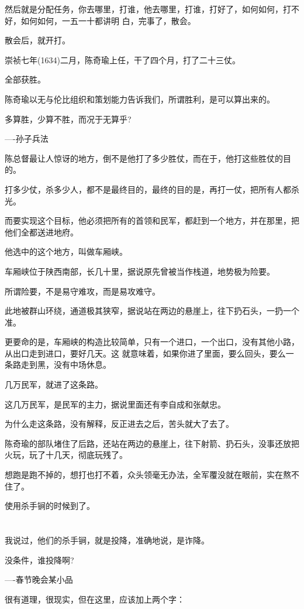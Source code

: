 \documentclass[11pt,a4paper,onecolumn]{article}
\begin{document}
然后就是分配任务，你去哪里，打谁，他去哪里，打谁，打好了，如何如何，打不好，如何如何，一五一十都讲明
白，完事了，散会。

散会后，就开打。

崇祯七年(1634)二月，陈奇瑜上任，干了四个月，打了二十三仗。

全部获胜。

陈奇瑜以无与伦比组织和策划能力告诉我们，所谓胜利，是可以算出来的。

多算胜，少算不胜，而况于无算乎?

----孙子兵法

陈总督最让人惊讶的地方，倒不是他打了多少胜仗，而在于，他打这些胜仗的目的。

打多少仗，杀多少人，都不是最终目的，最终的目的是，再打一仗，把所有人都杀光。

而要实现这个目标，他必须把所有的首领和民军，都赶到一个地方，并在那里，把他们全都送进地府。

他选中的这个地方，叫做车厢峡。

车厢峡位于陕西南部，长几十里，据说原先曾被当作栈道，地势极为险要。

所谓险要，不是易守难攻，而是易攻难守。

此地被群山环绕，通道极其狭窄，据说站在两边的悬崖上，往下扔石头，一扔一个准。

更要命的是，车厢峡的构造比较简单，只有一个进口，一个出口，没有其他小路，从出口走到进口，要好几天。这
就意味着，如果你进了里面，要么回头，要么一条路走到黑，没有中场休息。

几万民军，就进了这条路。

这几万民军，是民军的主力，据说里面还有李自成和张献忠。

为什么走这条路，没有解释，反正进去之后，苦头就大了去了。

陈奇瑜的部队堵住了后路，还站在两边的悬崖上，往下射箭、扔石头，没事还放把火玩，玩了十几天，彻底玩残了。

想跑是跑不掉的，想打也打不着，众头领毫无办法，全军覆没就在眼前，实在熬不住了。

使用杀手锏的时候到了。

\section[\thesection]{}

我说过，他们的杀手锏，就是投降，准确地说，是诈降。

没条件，谁投降啊?

----春节晚会某小品

很有道理，很现实，但在这里，应该加上两个字：
\end{document}
